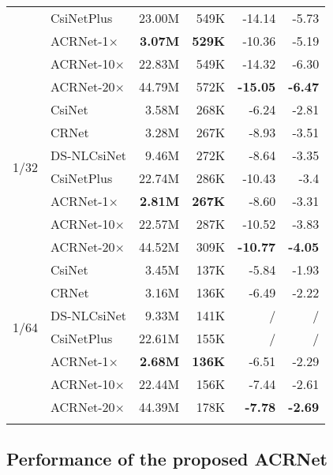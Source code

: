 \documentclass[12pt, draftclsnofoot, onecolumn]{IEEEtran}
\begin{document}
\begin{table}[H]
\begin{center}
\begin{tabular}{c l | r r | r r}
  & CsiNetPlus\cite{guo2020convolutional} & 23.00M & 549K & -14.14 & -5.73 \\
  & ACRNet-1$\times$ & \textbf{3.07M} & \textbf{529K} & -10.36 & -5.19 \\
  & ACRNet-10$\times$ & 22.83M & 549K & -14.32 & -6.30 \\
  & ACRNet-20$\times$ & 44.79M & 572K & \textbf{-15.05} & \textbf{-6.47} \\
\hline
\multirow{6}{*}{1/32}
  & CsiNet\cite{wen2018deep} & 3.58M & 268K & -6.24 & -2.81 \\
  & CRNet\cite{lu2020multi} & 3.28M & 267K & -8.93 & -3.51 \\
  & DS-NLCsiNet\cite{yu2020ds} & 9.46M & 272K & -8.64 & -3.35 \\
  & CsiNetPlus\cite{guo2020convolutional} & 22.74M & 286K & -10.43 & -3.4 \\
  & ACRNet-1$\times$ & \textbf{2.81M} & \textbf{267K} & -8.60 & -3.31 \\
  & ACRNet-10$\times$ & 22.57M & 287K & -10.52 & -3.83 \\
  & ACRNet-20$\times$ & 44.52M & 309K & \textbf{-10.77} & \textbf{-4.05} \\
\hline
\multirow{6}{*}{1/64}
  & CsiNet\cite{wen2018deep} & 3.45M & 137K & -5.84 & -1.93 \\
  & CRNet\cite{lu2020multi} & 3.16M & 136K & -6.49 & -2.22 \\
  & DS-NLCsiNet\cite{yu2020ds} & 9.33M & 141K & / & / \\
  & CsiNetPlus\cite{guo2020convolutional} & 22.61M & 155K & / & / \\
  & ACRNet-1$\times$ & \textbf{2.68M} & \textbf{136K} & -6.51 & -2.29 \\
  & ACRNet-10$\times$ & 22.44M & 156K & -7.44 & -2.61 \\
  & ACRNet-20$\times$ & 44.39M & 178K & \textbf{-7.78} & \textbf{-2.69} \\
\Xhline{0.8pt}
\multicolumn{5}{l}{$^{\mathrm{a}}$ / means the performance is not reported.} \\
\end{tabular}
\label{tab1}
\end{center}
\end{table}

\subsection{Performance of the proposed ACRNet} \label{Section5-2}
\end{document}
